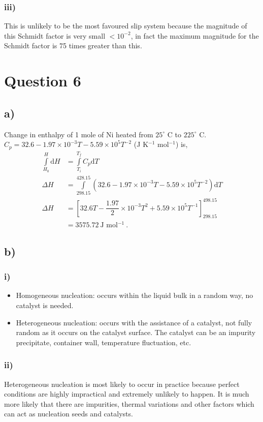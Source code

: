 \documentclass[a4paper]{article}
\begin{document}
	\subsubsection{iii)}
	This is unlikely to be the most favoured slip system because the magnitude of this Schmidt factor is very small $<10^{-2}$, in fact the maximum magnitude for the Schmidt factor is 75 times greater than this. 
	
	\section{Question 6}
	\subsection{a)}
	Change in enthalpy of 1 mole of Ni heated from $25 ^{\circ}$ C to $225^{\circ}$ C. $C_{p} = 32.6 - 1.97 \times 10^{-3} T - 5.59 \times 10^{5} T^{-2} $ (J K$^{-1}$ mol$^{-1}$) is,
	\begin{subequations}
		\begin{align}
			\int\limits_{H_{0}}^{H} \textrm{d}H &= \int\limits_{T_{i}}^{T_{f}} C_{p} \mathrm{d}T\\
			\Delta H &= \int\limits_{298.15}^{428.15} \left(
			32.6 - 1.97 \times 10^{-3} T - 5.59 \times 10^{5} T^{-2}
			\right) \textrm{d}T \\
			\Delta H &= \left[32.6 T - \dfrac{1.97}{2} \times 10^{-3} T^{2} + 5.59 \times 10^{5} T^{-1}\right]_{298.15}^{498.15}\\
					 &= 3575.72~ \textrm{J mol$^{-1}$}~.
		\end{align}
	\end{subequations}
	\subsection{b)}
	\subsubsection{i)}
	\begin{itemize}
		\item Homogeneous nucleation: occurs within the liquid bulk in a random way, no catalyst is needed.
		\item Heterogeneous nucleation: occurs with the assistance of a catalyst, not fully random as it occurs on the catalyst surface. The catalyst can be an impurity precipitate, container wall, temperature fluctuation, etc. 
	\end{itemize}
	\subsubsection{ii)}
	Heterogeneous nucleation is most likely to occur in practice because perfect conditions are highly impractical and extremely unlikely to happen. It is much more likely that there are impurities, thermal variations and other factors which can act as nucleation seeds and catalysts.
\end{document}
